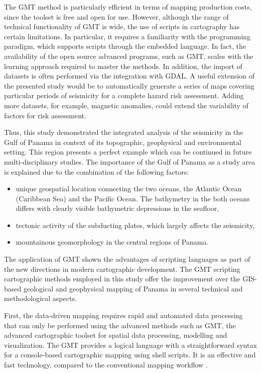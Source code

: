 \documentclass[USenglish,twocolumn]{article}
\begin{document}
The GMT method is particularly efficient in terms of mapping production costs, since the toolset is free and open for use. However, although the range of technical functionality of GMT is wide, the use of scripts in cartography has certain limitations. In particular, it requires a familiarity with the programming paradigm, which supports scripts through the embedded language. In fact, the availability of the open source advanced programs, such as GMT, scales with the learning approach required to master the methods. In addition, the import of datasets is often performed via the integration with GDAL. A useful extension of the presented study would be to automatically generate a series of maps covering particular periods of seismicity for a complete hazard risk assessment. Adding more datasets, for example, magnetic anomalies, could extend the variability of factors for risk assessment.

Thus, this study demonstrated the integrated analysis of the seismicity in the Gulf of Panama in context of its topographic, geophysical and environmental setting. This region presents a perfect example which can be continued in future multi-disciplinary studies. The importance of the Gulf of Panama as a study area is explained due to the combination of the following factors: 

\begin{itemize}
	\item unique geospatial location connecting the two oceans, the Atlantic Ocean (Caribbean Sea) and the Pacific Ocean. The bathymetry in the both oceans differs with clearly visible bathymetric depressions in the seafloor, 
	\item tectonic activity of the subducting plates, which largely affects the seismicity, 
	\item mountainous geomorphology in the central regions of Panama.
\end{itemize}

The application of GMT shown the advantages of scripting languages as part of the new directions in modern cartographic development. The GMT scripting cartographic methods employed in this study offer the improvement over the GIS-based geological and geophysical mapping of Panama in several technical and methodological aspects. 

First, the data-driven mapping requires rapid and automated data processing that can only be performed using the advanced methods such as GMT, the advanced cartographic toolset for spatial data processing, modelling and visualization. The GMT provides a logical language with a straightforward syntax for a console-based cartographic mapping using shell scripts\citep{5369602,Lemenkova202203,Lemenkova202212,8588718}. It is an effective and fast technology, compared to the conventional mapping workflow \cite{Ambraseys,Gonzalez,Wabnitz}.
\end{document}
